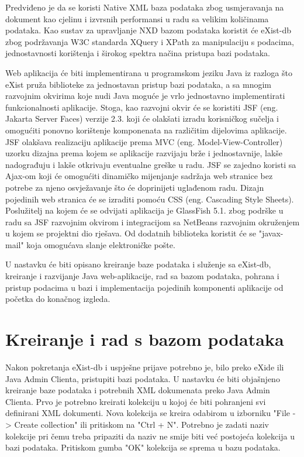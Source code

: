 \documentclass{foi}
\begin{document}
Predviđeno je da se koristi Native XML baza podataka zbog usmjeravanja na dokument kao cjelinu i izvrsnih performansi u radu sa velikim količinama podataka. Kao sustav za upravljanje NXD bazom podataka koristit će eXist-db zbog podržavanja W3C standarda XQuery i XPath za manipulaciju s podacima, jednostavnosti korištenja i širokog spektra načina pristupa bazi podataka.

Web aplikacija će biti implementirana u programskom jeziku Java iz razloga što eXist pruža biblioteke za jednostavan pristup bazi podataka, a sa mnogim razvojnim okvirima koje nudi Java moguće je vrlo jednostavno implementirati funkcionalnosti aplikacije. Stoga, kao razvojni okvir će se koristiti JSF (eng. Jakarta Server Faces) verzije 2.3. koji će olakšati izradu korisničkog sučelja i omogućiti ponovno korištenje komponenata na različitim dijelovima aplikacije. JSF olakšava realizaciju aplikacije prema MVC (eng. Model-View-Controller) uzorku dizajna prema kojem se aplikacije razvijaju brže i jednostavnije, lakše nadograđuju i lakše otkrivaju eventualne greške u radu. JSF se zajedno koristi sa Ajax-om koji će omogućiti dinamičko mijenjanje sadržaja web stranice bez potrebe za njeno osvježavanje što će doprinijeti uglađenom radu. Dizajn pojedinih web stranica će se izraditi pomoću CSS (eng. Cascading Style Sheets). Poslužitelj na kojem će se odvijati aplikacija je GlassFish 5.1. zbog podrške u radu sa JSF razvojnim okvirom i integracijom sa NetBeans razvojnim okruženjem u kojem se projektni dio rješava. Od dodatnih biblioteka koristit će se "javax-mail" koja omogućava slanje elektroničke pošte.

U nastavku će biti opisano kreiranje baze podataka i služenje sa eXist-db, kreiranje i razvijanje Java web-aplikacije, rad sa bazom podataka, pohrana i pristup podacima u bazi i implementacija pojedinih komponenti aplikacije od početka do konačnog izgleda.

\section{Kreiranje i rad s bazom podataka}

Nakon pokretanja eXist-db i uspješne prijave potrebno je, bilo preko eXide ili Java Admin Clienta, pristupiti bazi podataka. U nastavku će biti objašnjeno kreiranje baze podataka i potrebnih XML dokumenata preko Java Admin Clienta. Prvo je potrebno kreirati kolekciju u kojoj će biti pohranjeni svi definirani XML dokumenti. Nova kolekcija se kreira odabirom u izborniku "File -> Create collection" ili pritiskom na "Ctrl + N". Potrebno je zadati naziv kolekcije pri čemu treba pripaziti da naziv ne smije biti već postojeća kolekcija u bazi podataka. Pritiskom gumba "OK" kolekcija se sprema u bazu podataka. 
\end{document}
